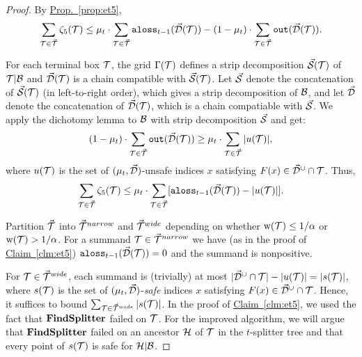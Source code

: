 \documentclass{acmsmall}
\newcommand{\cB}{{\cal B}}
\newcommand{\cD}{{\cal D}}
\newcommand{\cF}{{\cal F}}
\newcommand{\cH}{{\cal H}}
\newcommand{\cS}{{\cal S}}
\newcommand{\cT}{{\cal T}}
\newcommand{\Prop}[1]{\hyperref[prop:#1]{Prop.~\ref*{prop:#1}}} %
\newcommand{\Clm}[1]{\hyperref[clm:#1]{Claim~\ref*{clm:#1}}} %
\newcommand{\lis}{{\tt lis}}
\newcommand{\alis}{{\tt alis}}
\newcommand{\aloss}{{\tt aloss}}
\newcommand{\outside}{{\tt out}}
\newcommand{\kappaest}{\widehat{\kappa}}
\newcommand{\strip}[2]{#1|#2}
\newcommand{\width}{{\bf {\rm  w}}}
\newcommand{\gridprec}{\alpha}
\newcommand{\errorterm}{\zeta}
\newcommand{\findsplitter}{{\rm {\bf FindSplitter}}}
\begin{document}
\begin{proof} By \Prop{et5},
$$ \sum_{\cT \in \vec{\cT}} \errorterm_5(\cT) \leq 
\mu_t\cdot \sum_{\cT \in \vec{\cT}} \aloss_{t-1}(\vec{\cD}(\cT))
- (1-\mu_t)\cdot \sum_{\cT \in \vec{\cT}}\outside(\vec{\cD}(\cT)).$$

For each terminal box $\cT$, the grid $\Gamma(\cT)$ defines a strip decomposition $\vec{\cS}(\cT)$ of $\strip{\cT}{\cB}$ and $\vec{\cD}(\cT)$
is a chain compatible with $\vec{\cS}(\cT)$.  Let $\vec{\cS}$ denote the concatenation of $\vec{\cS}(\cT)$ (in left-to-right order), which
gives a strip decomposition of $\cB$, and let $\vec{\cD}$ denote the concatenation of $\vec{\cD}(\cT)$, which is a chain compatiable
with $\vec{\cS}$.  
We apply the dichotomy lemma to $\cB$ with strip decomposition $\vec{\cS}$ and get:
$$ (1-\mu_t)\cdot \sum_{\cT \in \vec{\cT}}\outside(\vec{\cD}(\cT)) \geq
\mu_t \cdot \sum_{\cT \in \vec{\cT}} |u(\cT)|,$$
%
%
%
where $u(\cT)$ is the set of $(\mu_t,\vec{\cD})$-unsafe indices $x$ satisfying $F(x) \in \vec{\cD}^{\cup} \cap \cT$. Thus,
$$ \sum_{\cT \in \vec{\cT}} \errorterm_5(\cT) \leq 
\mu_t\cdot \sum_{\cT \in \vec{\cT}} [\aloss_{t-1}(\vec{\cD}(\cT))
- |u(\cT)|].$$

%

Partition $\vec{\cT}$ into $\vec{\cT}^{narrow}$ and $\vec{\cT}^{wide}$ depending on
whether $\width(\cT) \leq 1/\gridprec$ or $\width(\cT) > 1/\gridprec$.
For a summand $\cT \in \vec{\cT}^{narrow}$  we have (as in the proof of \Clm{et5})
$\aloss_{t-1}(\vec{\cD}(\cT)) = 0$
and the summand is nonpositive.

For $\cT \in \vec{\cT}^{wide}$, each summand is (trivially) at most  
$|\vec{\cD}^{\cup} \cap \cT| - |u(\cT)| = |s(\cT)|$,
where $s(\cT)$ is the set of $(\mu_t,\vec{\cD})$-\emph{safe} indices $x$ satisfying $F(x) \in \vec{\cD}^{\cup} \cap \cT$.
Hence, it suffices
to bound $\sum_{\cT \in \vec{\cT}^{wide}}|s(\cT)|$.
In the proof of \Clm{et5}, we used the fact that $\findsplitter$ failed on $\cT$.   
For the improved algorithm, we will argue that $\findsplitter$ failed on an ancestor $\cH$ of $\cT$ in
the $t$-splitter tree and that every point of $s(\cT)$ is safe for $\strip{\cH}{\cB}$.


\end{proof}
\end{document}
